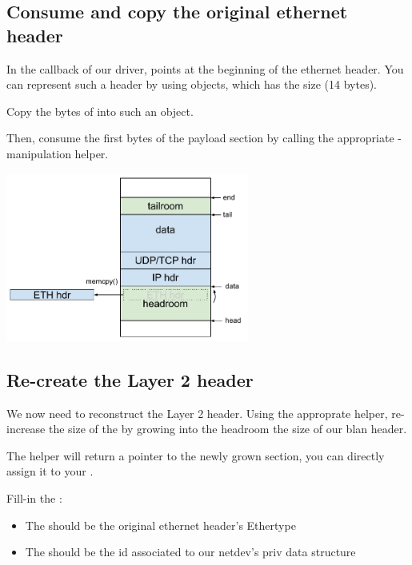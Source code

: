 \subsection{Consume and copy the original ethernet header}

In the  callback of our driver,  points at
the beginning of the ethernet header. You can represent such a header by using  objects, which has the size  (14 bytes).

Copy the  bytes of  into such an object.

Then, consume the first  bytes of the payload section by calling the appropriate -manipulation helper.

\begin{center}
\includegraphics[width=0.6\textwidth]{labs/networking-skb/02_blan_skb.pdf}
\end{center}

\subsection{Re-create the Layer 2 header}

We now need to reconstruct the Layer 2 header. Using the approprate  helper, re-increase the size of the  by growing into the headroom the size of our blan header.

The helper will return a pointer to the newly grown section, you can directly assign it to your .

Fill-in the  :
\begin{itemize}
	\item The  should be the original ethernet header's Ethertype
	\item The  should be the id associated to our netdev's priv data structure
\end{itemize}

